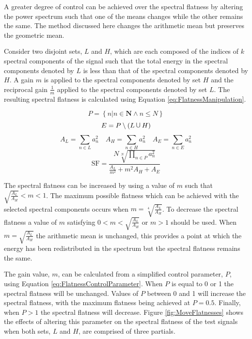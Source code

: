 			A greater degree of control can be achieved over the spectral flatness by altering the power
			spectrum such that one of the means changes while the other remains the same. The method discussed
			here changes the arithmetic mean but preserves the geometric mean. 

			Consider two disjoint sets, $L$ and $H$, which are each composed of the indices of $k$ spectral
			components of the signal such that the total energy in the spectral components denoted by $L$ is
			less than that of the spectral components denoted by $H$. A gain $m$ is applied to the spectral
			components denoted by set $H$ and the reciprocal gain $\frac{1}{m}$ applied to the spectral
			components denoted by set $L$. The resulting spectral flatness is calculated using Equation
			\ref{eq:FlatnessManipulation}.

			\[ P = \left\{ n | n \in \textbf{N} \land n \leq N \right\} \]
			\[ E = P \setminus (L \medcup H) \]
			\[ A_{L} = \sum_{n \in L} a_{n}^{2} \quad A_{H} = \sum_{n \in H} a_{n}^{2}
			   \quad A_{E} = \sum_{n \in E} a_{n}^{2} \]
			\begin{equation}
				\textrm{SF} = \frac{N\sqrt[N]{\prod_{n \in P} a_{n}^{2}}}
						   {\frac{A_{L}}{m^{2}} + m^{2}A_{H} + A_{E}}
				\label{eq:FlatnessManipulation}
			\end{equation}

			The spectral flatness can be increased by using a value of $m$ such that
			$\sqrt{\frac{A_{L}}{A_{H}}} < m < 1$. The maximum possible flatness which can be achieved with the
			selected spectral components occurs when $m = \sqrt[4]{\frac{A_{L}}{A_{H}}}$. To decrease the
			spectral flatness a value of $m$ satisfying $0 < m < \sqrt{\frac{A_{L}}{A_{H}}}$ or $m > 1$ should
			be used. When $m = \sqrt{\frac{A_{L}}{A_{H}}}$ the arithmetic mean is unchanged, this provides a
			point at which the energy has been redistributed in the spectrum but the spectral flatness remains
			the same. 

			The gain value, $m$, can be calculated from a simplified control parameter, $P$, using Equation
			\ref{eq:FlatnessControlParameter}. When $P$ is equal to 0 or 1 the spectral flatness will be
			unchanged. Values of $P$ between 0 and 1 will increase the spectral flatness, with the maximum
			flatness being achieved at $P = 0.5$. Finally, when $P > 1$ the spectral flatness will decrease.
			Figure \ref{fig:MoveFlatnesses} shows the effects of altering this parameter on the spectral
			flatness of the test signals when both sets, $L$ and $H$, are comprised of three partials.

